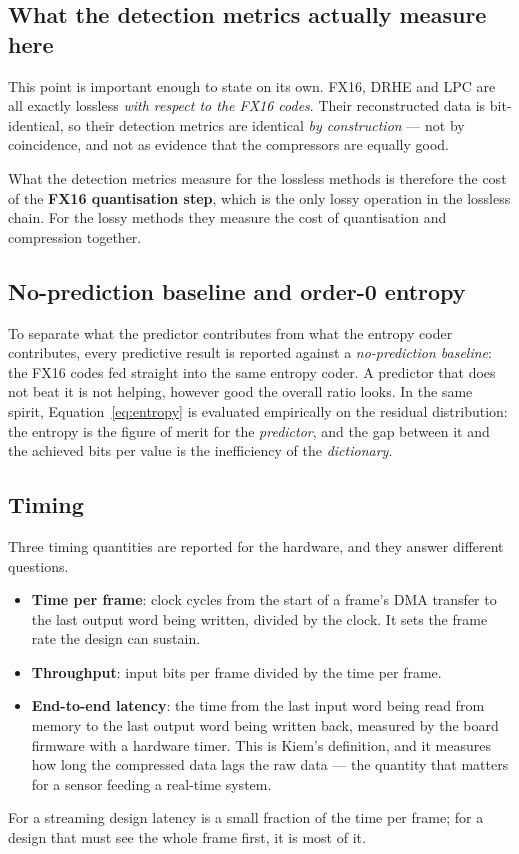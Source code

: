 \subsection{What the detection metrics actually measure here}

This point is important enough to state on its own. FX16, DRHE and LPC are all
exactly lossless \emph{with respect to the FX16 codes}. Their reconstructed
data is bit-identical, so their detection metrics are identical \emph{by
construction} --- not by coincidence, and not as evidence that the compressors
are equally good.

What the detection metrics measure for the lossless methods is therefore the
cost of the \textbf{FX16 quantisation step}, which is the only lossy operation
in the lossless chain. For the lossy methods they measure the cost of
quantisation and compression together.

\subsection{No-prediction baseline and order-0 entropy}
To separate what the predictor contributes from what the entropy coder
contributes, every predictive result is reported against a \emph{no-prediction
baseline}: the FX16 codes fed straight into the same entropy coder. A predictor
that does not beat it is not helping, however good the overall ratio looks. In
the same spirit, Equation~\eqref{eq:entropy} is evaluated empirically on the
residual distribution: the entropy is the figure of merit for the
\emph{predictor}, and the gap between it and the achieved bits per value is the
inefficiency of the \emph{dictionary}.

\subsection{Timing}
Three timing quantities are reported for the hardware, and they answer
different questions.
\begin{itemize}
\item \textbf{Time per frame}: clock cycles from the start of a frame's DMA
transfer to the last output word being written, divided by the clock. It sets the frame rate the
design can sustain.
\item \textbf{Throughput}: input bits per frame divided by the time per frame.
\item \textbf{End-to-end latency}: the time from the last input word being read
from memory to the last output word being written back, measured by the board
firmware with a hardware timer. This is Kiem's definition, and it measures how
long the compressed data lags the raw data --- the quantity that matters for a
sensor feeding a real-time system.
\end{itemize}
For a streaming design latency is a small fraction of the time per frame; for
a design that must see the whole frame first, it is most of it.


